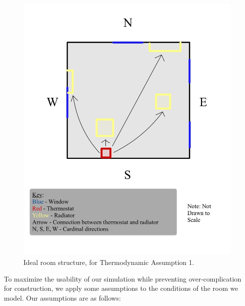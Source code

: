\documentclass[conference,letterpaper]{IEEEtran}
\begin{document}
\begin{figure}[ht!]
\includegraphics[scale=0.2]{room_3.jpg}
\caption{Ideal room structure, for Thermodynamic Assumption 1.}
\label{fig:thermo_assumptions}
\end{figure}
To maximize the usability of our simulation while preventing over-complication for construction, we apply some assumptions to the conditions of the room we model. Our assumptions are as follows:
\end{document}
